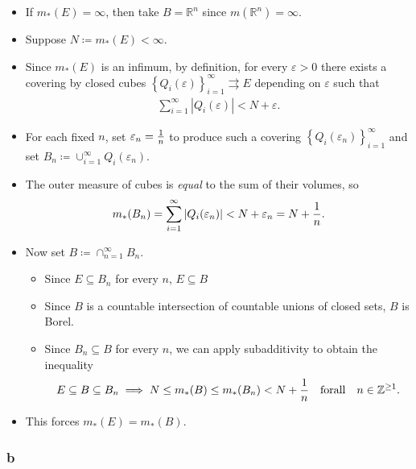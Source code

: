 \begin{solution}
\begin{itemize}
\item
  If \(m_*(E) = \infty\), then take \(B = {\mathbb{R}}^n\) since
  \(m({\mathbb{R}}^n) = \infty\).
\item
  Suppose \(N \coloneqq m_*(E) < \infty\).
\item
  Since \(m_*(E)\) is an infimum, by definition, for every
  \(\varepsilon> 0\) there exists a covering by closed cubes
  \(\left\{{Q_i(\varepsilon)}\right\}_{i=1}^\infty \rightrightarrows E\)
  depending on \(\varepsilon\) such that
  \begin{align*}
  \sum_{i=1}^\infty {\left\lvert {Q_i(\varepsilon)} \right\rvert} < N + \varepsilon
  .\end{align*}
\item
  For each fixed \(n\), set \(\varepsilon_n = {1\over n}\) to produce
  such a covering \(\left\{{Q_i(\varepsilon_n)}\right\}_{i=1}^\infty\)
  and set \(B_n \coloneqq\cup_{i=1}^\infty Q_i(\varepsilon_n)\).
\item
  The outer measure of cubes is \emph{equal} to the sum of their
  volumes, so
  \begin{align*}
  m_*(B_n) = \sum_{i=1}^\infty {\left\lvert {Q_i(\varepsilon_n)} \right\rvert} < N + \varepsilon_n = N + {1\over n}
  .\end{align*}
\item
  Now set \(B \coloneqq\cap_{n=1}^\infty B_n\).

  \begin{itemize}
  \tightlist
  \item
    Since \(E\subseteq B_n\) for every \(n\), \(E\subseteq B\)
  \item
    Since \(B\) is a countable intersection of countable unions of
    closed sets, \(B\) is Borel.
  \item
    Since \(B_n \subseteq B\) for every \(n\), we can apply
    subadditivity to obtain the inequality
    \begin{align*}
    E \subseteq B \subseteq B_n \implies
    N \leq m_*(B) \leq m_*(B_n) < N + {1\over n} {\quad \operatorname{for all} \quad} n\in {\mathbb{Z}}^{\geq 1}
    .\end{align*}
  \end{itemize}
\item
  This forces \(m_*(E) = m_*(B)\).
\end{itemize}

\hypertarget{b}{%
\subsubsection{b}\label{b}}


\end{solution}
